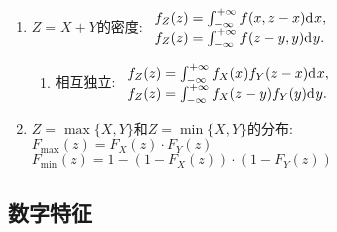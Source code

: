\begin{enumerate}
\item $Z=X+Y$的密度: $\begin{array}{l}
f_Z(z)=\int_{-\infty}^{+\infty}f(x,z-x){\mathrm{d}\:\!} x,\\
f_Z(z)=\int_{-\infty}^{+\infty}f(z-y, y){\mathrm{d}\:\!} y.
\end{array}$
\begin{enumerate}
\item 相互独立: $\begin{array}{l}
f_Z(z)=\int_{-\infty}^{+\infty}f_X(x)f_Y(z-x){\mathrm{d}\:\!} x,\\
f_Z(z)=\int_{-\infty}^{+\infty}f_X(z-y)f_Y(y){\mathrm{d}\:\!} y.
\end{array}$
\end{enumerate}
\item $Z=\max\{X,Y\}$和$Z=\min\{X,Y\}$的分布: \\
$F_{\max}(z)=F_X(z)\cdot F_Y(z)$\\
$F_{\min}(z)=1-(1-F_X(z))\cdot(1-F_Y(z))$
\end{enumerate}

\subsection{数字特征}

